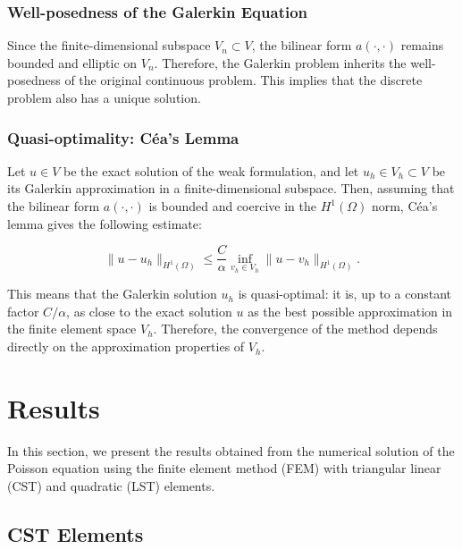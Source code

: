 \documentclass[12pt]{article}
\begin{document}
\subsubsection*{Well-posedness of the Galerkin Equation}

Since the finite-dimensional subspace \( V_n \subset V \), the bilinear form \( a(\cdot, \cdot) \) remains bounded and elliptic on \( V_n \). Therefore, the Galerkin problem inherits the well-posedness of the original continuous problem. This implies that the discrete problem also has a unique solution.

\subsubsection*{Quasi-optimality: Céa's Lemma}

Let \( u \in V \) be the exact solution of the weak formulation, and let \( u_h \in V_h \subset V \) be its Galerkin approximation in a finite-dimensional subspace. Then, assuming that the bilinear form \( a(\cdot, \cdot) \) is bounded and coercive in the \( H^1(\Omega) \) norm, Céa's lemma gives the following estimate:

\begin{equation}
\| u - u_h \|_{H^1(\Omega)} \leq \frac{C}{\alpha} \inf_{v_h \in V_h} \| u - v_h \|_{H^1(\Omega)}.
\end{equation}

This means that the Galerkin solution \( u_h \) is quasi-optimal: it is, up to a constant factor \( C / \alpha \), as close to the exact solution \( u \) as the best possible approximation in the finite element space \( V_h \). Therefore, the convergence of the method depends directly on the approximation properties of \( V_h \).


\newpage
\section{Results}

In this section, we present the results obtained from the numerical solution of the Poisson equation using the finite element method (FEM) with triangular linear (CST) and quadratic (LST) elements.

\subsection{CST Elements}
\end{document}
